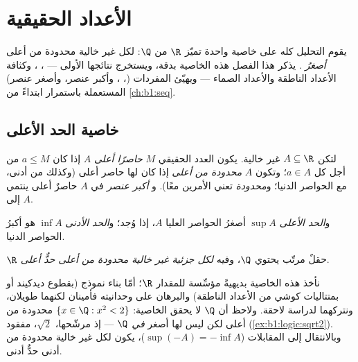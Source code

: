 \chapter{الأعداد الحقيقية}\label{ch:b1:reals}

يقوم التحليل كله على خاصية واحدة تميّز $\R$ من
$\Q$: لكل  غير خالية محدودة من أعلى \emph{أصغرُ} . يذكر هذا الفصل هذه الخاصية بدقة، ويستخرج نتائجها
الأولى --- ، ،
وكثافة الأعداد الناطقة والأعداد الصماء --- ويهيّئ
المفردات (، ، وأكبر عنصر، وأصغر عنصر) المستعملة باستمرار ابتداءً من
\cref{ch:b1:seq}.

\section{خاصية الحد الأعلى}

\begin{definition}\label{def:b1:reals:bounds}
لتكن $A \subseteq \R$ غير خالية. يكون العدد الحقيقي $M$ \emph{حاصرًا
أعلى}  $A$ إذا كان $a \leq M$ من أجل كل $a \in A$؛
وتكون $A$ \emph{محدودة من أعلى} إذا كان لها حاصر أعلى (وكذلك
من أدنى، مع الحواصر الدنيا؛ و\emph{محدودة} تعني الأمرين معًا). و
\emph{أكبر عنصر} في $A$ حاصرٌ أعلى ينتمي إلى $A$.

و\emph{الحد الأعلى} $\sup A$ أصغرُ الحواصر العليا
 $A$، إذا وُجد؛ و\emph{الحد الأدنى} $\inf A$ هو
أكبرُ الحواصر الدنيا.
\end{definition}

\begin{theorem}\label{thm:b1:reals:sup}
$\R$ حقلٌ مرتّب يحتوي $\Q$، وفيه \emph{لكل  جزئية
غير خالية محدودة من أعلى حدٌّ أعلى}.
\end{theorem}
\admitted

\begin{remark}
نأخذ هذه الخاصية بديهيةً مؤسِّسة للمقدار $\R$؛ أمّا بناء نموذج (بقطوع
ديدكيند أو بمتتاليات كوشي من الأعداد الناطقة) والبرهان على وحدانيته
فأمينان لكنهما طويلان، ونتركهما لدراسة لاحقة. ولاحظ
أن $\Q$ لا يحقق الخاصية:  $\{x \in \Q : x^2 < 2\}$ محدودة
من أعلى لكن ليس لها أصغر  \emph{في $\Q$} --- إذ مرشّحها،
$\sqrt 2$، مفقود (\cref{ex:b1:logic:sqrt2}). وبالانتقال إلى
المقابلات ($\sup(-A) = -\inf A$)، يكون لكل  غير خالية محدودة من أدنى
حدٌّ أدنى.
\end{remark}

